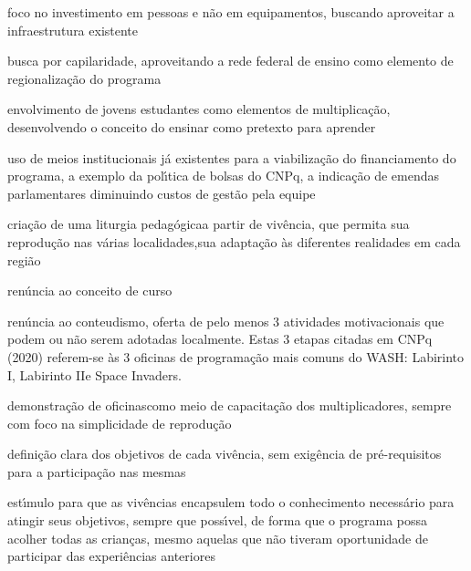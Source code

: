 \documentclass[
12pt,		%
openright,	%
twoside,  %
a4paper,			%
chapter=TITLE,		%
english,			%
french,				%
spanish,			%
brazil				%
]{USPSC-classe/USPSC}
\begin{document}
\begin{alineas}
\item \textquotedbl foco no investimento em pessoas e n\~ao em equipamentos, buscando aproveitar a infraestrutura existente\textquotedbl 
\item \textquotedbl busca por capilaridade, aproveitando a rede federal de ensino como elemento de regionaliza\c{c}\~ao do programa\textquotedbl 
\item \textquotedbl envolvimento de jovens estudantes como elementos de multiplica\c{c}\~ao, desenvolvendo o conceito do ensinar como pretexto para aprender\textquotedbl 
\item \textquotedbl uso de meios institucionais j\'a existentes para a viabiliza\c{c}\~ao do financiamento do programa, a exemplo da pol\'{\i}tica de bolsas do CNPq, a indica\c{c}\~ao de emendas parlamentares diminuindo custos de gest\~ao pela equipe\textquotedbl 
\item \textquotedbl cria\c{c}\~ao de uma  \textquotedbl liturgia pedag\'ogica\textquotedbl  a partir de viv\^encia, que permita sua reprodu\c{c}\~ao nas v\'arias localidades,sua adapta\c{c}\~ao \`as diferentes realidades em cada regi\~ao\textquotedbl 
\item \textquotedbl ren\'uncia ao conceito de curso\textquotedbl 
\item \textquotedbl ren\'uncia ao conteudismo, oferta de pelo menos 3  atividades motivacionais que podem ou n\~ao serem adotadas localmente\textquotedbl . Estas 3 etapas citadas em  CNPq (2020) referem-se \`as 3 oficinas de programa\c{c}\~ao mais comuns do WASH: \textquotedbl Labirinto I\textquotedbl , \textquotedbl Labirinto II\textquotedbl  e \textquotedbl Space Invaders\textquotedbl .
\item \textquotedbl demonstra\c{c}\~ao de oficinas\textquotedbl  como meio de capacita\c{c}\~ao dos multiplicadores, sempre com foco na
simplicidade de reprodu\c{c}\~ao\textquotedbl 
\item \textquotedbl defini\c{c}\~ao clara dos objetivos de cada viv\^encia, sem exig\^encia de pr\'e-requisitos para a participa\c{c}\~ao nas mesmas\textquotedbl 
\item \textquotedbl est\'{\i}mulo para que as viv\^encias encapsulem todo o conhecimento necess\'ario para  atingir  seus objetivos, sempre que poss\'{\i}vel, de forma que o programa possa acolher todas as crian\c{c}as, mesmo aquelas que n\~ao tiveram oportunidade de participar das experi\^encias anteriores\textquotedbl 
\end{alineas}
\end{document}
